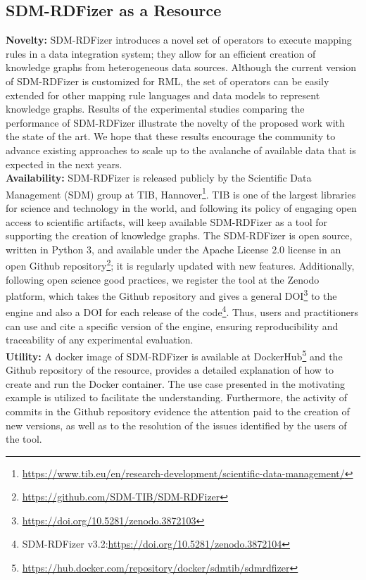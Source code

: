 \subsection{SDM-RDFizer as a Resource}
\label{sec:resource}
\textbf{Novelty:}
SDM-RDFizer introduces a novel set of operators to execute mapping rules in a data integration system; they allow for an efficient creation of knowledge graphs from heterogeneous data sources. Although the current version of SDM-RDFizer is customized for RML, the set of operators can be easily extended for other mapping rule languages and data models to represent knowledge graphs. Results of the experimental studies comparing the performance of SDM-RDFizer illustrate the novelty of the proposed work with the state of the art. We hope that these results encourage the community to advance existing approaches to scale up to the avalanche of available data that is expected in the next years.
\\
\textbf{Availability:}
SDM-RDFizer is released publicly by the Scientific Data Management (SDM) group at TIB, Hannover\footnote{\url{https://www.tib.eu/en/research-development/scientific-data-management/}}. 
TIB is one of the largest libraries for science and technology in the world, and following its policy of engaging open access to scientific artifacts, will keep available SDM-RDFizer as a tool for supporting the creation of knowledge graphs.  
The SDM-RDFizer is open source, written in Python 3, and available under the Apache License 2.0 license in an open Github repository\footnote{\url{https://github.com/SDM-TIB/SDM-RDFizer}}; it is regularly updated with new features. 
Additionally, following open science good practices, we register the tool at the Zenodo platform, which takes the Github repository and gives a general DOI\footnote{\url{https://doi.org/10.5281/zenodo.3872103}} to the engine and also a DOI for each release of the code\footnote{SDM-RDFizer v3.2:\url{https://doi.org/10.5281/zenodo.3872104}}. 
Thus, users and practitioners can use and cite a specific version of the engine, ensuring reproducibility and traceability of any experimental evaluation.
\\
\textbf{Utility:}
A docker image of SDM-RDFizer is available at DockerHub\footnote{\url{https://hub.docker.com/repository/docker/sdmtib/sdmrdfizer}} and the Github repository of the resource, provides a detailed explanation of how to create and run the Docker container. The use case presented in the motivating example is utilized to facilitate the understanding. Furthermore, the activity of commits in the Github repository evidence the attention paid to the creation of new versions, as well as to the resolution of the issues identified by the users of the tool.   
